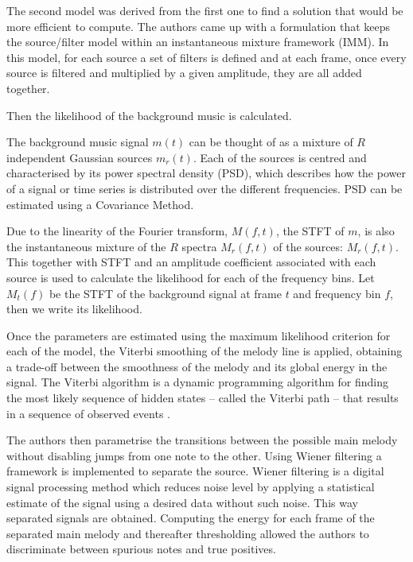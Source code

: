 The second model was derived from the first one to find a solution that would be more efficient to compute. The authors came up with a formulation that keeps the source/filter model within an instantaneous mixture framework (IMM). In this model, for each source a set of filters is defined and at each frame, once every source is filtered and multiplied by a given amplitude, they are all added together.

Then the likelihood of the background music is calculated.

The background music signal $m(t)$ can be thought of as a mixture of $R$ independent Gaussian sources $m_{r}(t)$. Each of the sources is centred and characterised by its power spectral density (PSD), which describes how the power of a signal or time series is distributed over the different frequencies. PSD can be estimated using a Covariance Method.

Due to the linearity of the Fourier transform, $M(f,t)$, the STFT of $m$, is also the instantaneous mixture of the $R$ spectra $M_{r}(f,t)$ of the sources: $M_{r}(f,t)$.
This together with STFT and an amplitude coefficient associated with each source is used to calculate the likelihood for each of the frequency bins. Let $M_{t}(f)$ be the STFT of the background signal at frame $t$ and frequency bin $f$, then we write its likelihood.

Once the parameters are estimated using the maximum likelihood criterion for each of the model, the Viterbi smoothing of the melody line is applied, obtaining a trade-off between the smoothness of the melody and its global energy in the signal. The Viterbi algorithm is a dynamic programming algorithm for finding the most likely sequence of hidden states – called the Viterbi path – that results in a sequence of observed events \cite{viterbi}.
 
The authors then parametrise the transitions between the possible main melody without disabling jumps from one note to the other. Using Wiener filtering a framework is implemented to separate the source. Wiener filtering is a digital signal processing method which reduces noise level by applying a statistical estimate of the signal using a desired data without such noise. This way separated signals are obtained. Computing the energy for each frame of the separated main melody and thereafter thresholding allowed the authors to discriminate between spurious notes and true positives.

\vspace{10pt}


